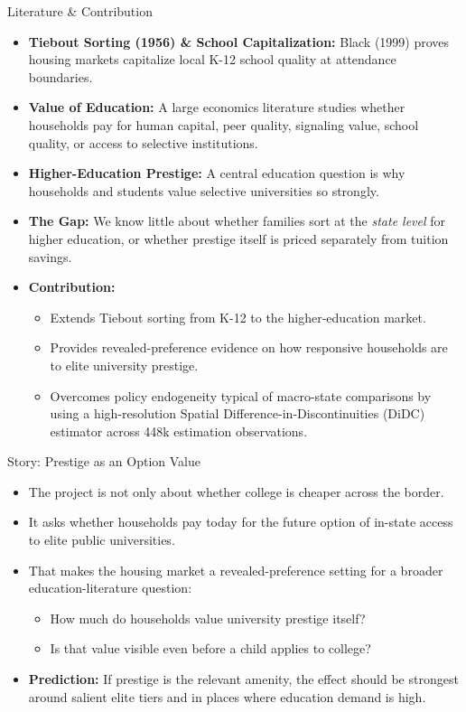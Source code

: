 \documentclass[10pt, aspectratio=169]{beamer}
\begin{document}
\begin{frame}{Literature \& Contribution}
    \begin{itemize}
        \item \textbf{Tiebout Sorting (1956) \& School Capitalization:} Black (1999) proves housing markets capitalize local K-12 school quality at attendance boundaries.
        \item \textbf{Value of Education:} A large economics literature studies whether households pay for human capital, peer quality, signaling value, school quality, or access to selective institutions.
        \item \textbf{Higher-Education Prestige:} A central education question is why households and students value selective universities so strongly.
        \item \textbf{The Gap:} We know little about whether families sort at the \textit{state level} for higher education, or whether prestige itself is priced separately from tuition savings.
        \item \textbf{Contribution:} 
        \begin{itemize}
            \item Extends Tiebout sorting from K-12 to the higher-education market.
            \item Provides revealed-preference evidence on how responsive households are to elite university prestige.
            \item Overcomes policy endogeneity typical of macro-state comparisons by using a high-resolution Spatial Difference-in-Discontinuities (DiDC) estimator across 448k estimation observations.
        \end{itemize}
    \end{itemize}
\end{frame}

\begin{frame}{Story: Prestige as an Option Value}
    \begin{itemize}
        \item The project is not only about whether college is cheaper across the border.
        \item It asks whether households pay today for the future option of in-state access to elite public universities.
        \item That makes the housing market a revealed-preference setting for a broader education-literature question:
        \begin{itemize}
            \item How much do households value university prestige itself?
            \item Is that value visible even before a child applies to college?
        \end{itemize}
        \item \textbf{Prediction:} If prestige is the relevant amenity, the effect should be strongest around salient elite tiers and in places where education demand is high.
    \end{itemize}
\end{frame}
\end{document}
